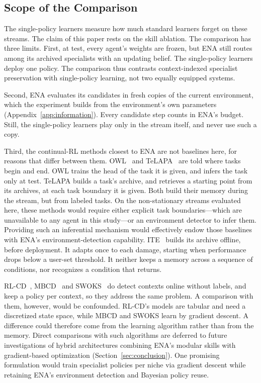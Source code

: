 \subsection{Scope of the Comparison}
\label{sec:scope}
The single-policy learners measure how much standard learners forget on these streams. The claim of this paper rests on the skill ablation. The comparison has three limits. First, at test, every agent's weights are frozen, but ENA still routes among its archived specialists with an updating belief. The single-policy learners deploy one policy. The comparison thus contrasts context-indexed specialist preservation with single-policy learning, not two equally equipped systems.

Second, ENA evaluates its candidates in fresh copies of the current environment, which the experiment builds from the environment's own parameters (Appendix~\ref{app:information}). Every candidate step counts in ENA's budget. Still, the single-policy learners play only in the stream itself, and never use such a copy.

Third, the continual-RL methods closest to ENA are not baselines here, for reasons that differ between them. OWL~\citep{kessler2022same} and TeLAPA~\citep{lillo2026beyond} are told where tasks begin and end. OWL trains the head of the task it is given, and infers the task only at test. TeLAPA builds a task's archive, and retrieves a starting point from its archives, at each task boundary it is given. Both build their memory during the stream, but from labeled tasks. On the non-stationary streams evaluated here, these methods would require either explicit task boundaries---which are unavailable to any agent in this study---or an environment detector to infer them. Providing such an inferential mechanism would effectively endow those baselines with ENA's environment-detection capability. ITE~\citep{cully2015robots} builds its archive offline, before deployment. It adapts once to each damage, starting when performance drops below a user-set threshold. It neither keeps a memory across a sequence of conditions, nor recognizes a condition that returns.

RL-CD~\citep{dasilva2006dealing}, MBCD~\citep{alegre2021minimum} and SWOKS~\citep{dick2024statistical} do detect contexts online without labels, and keep a policy per context, so they address the same problem. A comparison with them, however, would be confounded. RL-CD's models are tabular and need a discretized state space, while MBCD and SWOKS learn by gradient descent. A difference could therefore come from the learning algorithm rather than from the memory. Direct comparisons with such algorithms are deferred to future investigations of hybrid architectures combining ENA's modular skills with gradient-based optimization (Section~\ref{sec:conclusion}). One promising formulation would train specialist policies per niche via gradient descent while retaining ENA's environment detection and Bayesian policy reuse.

